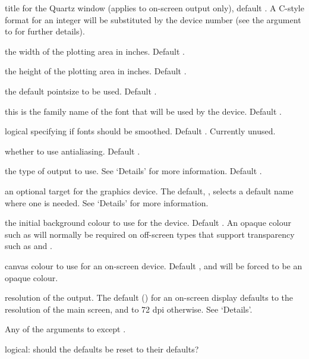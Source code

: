 \begin{Arguments}
\begin{ldescription}
\item[\code{title}] title for the Quartz window (applies to on-screen output
only), default .  A C-style format for an integer
will be substituted by the device number (see the 
argument to  for further details).
\item[\code{width}] the width of the plotting area in inches.  Default .
\item[\code{height}] the height of the plotting area in inches.  Default .
\item[\code{pointsize}] the default pointsize to be used.  Default .
\item[\code{family}] this is the family name of the font
that will be used by the device.  Default .
\item[\code{fontsmooth}] logical specifying if fonts should be
smoothed. Default .  Currently unused.
\item[\code{antialias}] whether to use antialiasing.  Default .
\item[\code{type}] the type of output to use.  See `Details' for
more information.  Default .
\item[\code{file}] an optional target for the graphics device. The default,
, selects a default name where one is needed.  See
`Details' for more information.
\item[\code{bg}] the initial background colour to use for the device.  Default
.  An opaque colour such as  will
normally be required on off-screen types that support transparency
such as  and .
\item[\code{canvas}] canvas colour to use for an on-screen device.  Default
, and will be forced to be an opaque colour.
\item[\code{dpi}] resolution of the output.  The default ()
for an on-screen display defaults to the resolution of
the main screen, and to 72 dpi otherwise.  See `Details'.
\item[\code{...}] Any of the arguments to  except .
\item[\code{reset}] logical: should the defaults be reset to their defaults?
\end{ldescription}
\end{Arguments}
